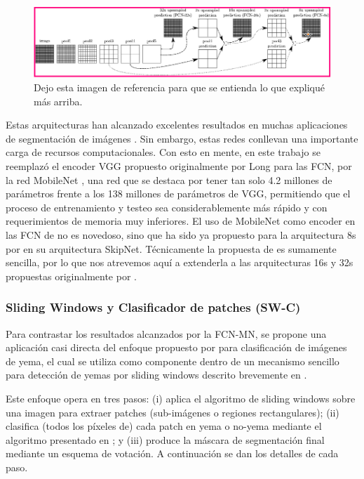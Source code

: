 \documentclass[a4paper,authoryear,review]{elsarticle}
\begin{document}
\begin{figure}
    \centering
    \includegraphics[width=12cm]{figures/FCN2.png}
    \caption{Dejo esta imagen de referencia para que se entienda lo que expliqué más arriba.}
    \label{fig:dataset}
\end{figure}

Estas arquitecturas han alcanzado excelentes resultados en muchas aplicaciones de segmentación de imágenes \cite{litjens2017survey, garcia2018survey, kaymak2019brief}. Sin embargo, estas redes conllevan una importante carga de recursos computacionales. Con esto en mente, en este trabajo se reemplazó el encoder VGG \cite{Simonyan2015VeryDC} propuesto originalmente por Long para las FCN, por la red MobileNet \cite{howard2017mobilenets}, una red que se destaca por tener tan solo 4.2 millones de parámetros frente a los 138 millones de parámetros de VGG, permitiendo que el proceso de entrenamiento y testeo sea considerablemente más rápido y con requerimientos de memoria muy inferiores. El uso de MobileNet como encoder en las FCN de \citep{long2015fully, shelhamer2017fully} no es novedoso, sino que ha sido ya propuesto para la arquitectura 8s por \citet{siam2018rtseg} en su arquitectura SkipNet. Técnicamente la propuesta de \citet{siam2018rtseg} es sumamente sencilla, por lo que nos atrevemos aquí a extenderla a las arquitecturas 16s y 32s propuestas originalmente por \citep{long2015fully, shelhamer2017fully}.

\subsubsection{Sliding Windows y Clasificador de patches (SW-C)}


Para contrastar los resultados alcanzados por la FCN-MN, se propone una aplicación casi directa del enfoque propuesto por \citet{perez2017image} para clasificación de imágenes de yema, el cual se utiliza como componente dentro de un mecanismo sencillo para detección de yemas por sliding windows descrito brevemente en \citet{perez2017image}. 

Este enfoque opera en tres pasos: (i) aplica el algoritmo de sliding windows sobre una imagen para extraer patches (sub-imágenes o regiones rectangulares); (ii) clasifica (todos los píxeles de) cada patch en yema o no-yema mediante el algoritmo presentado en \citet{perez2017image}; y (iii) produce la máscara de segmentación final mediante un esquema de votación. A continuación se dan los detalles de cada paso.
\end{document}

